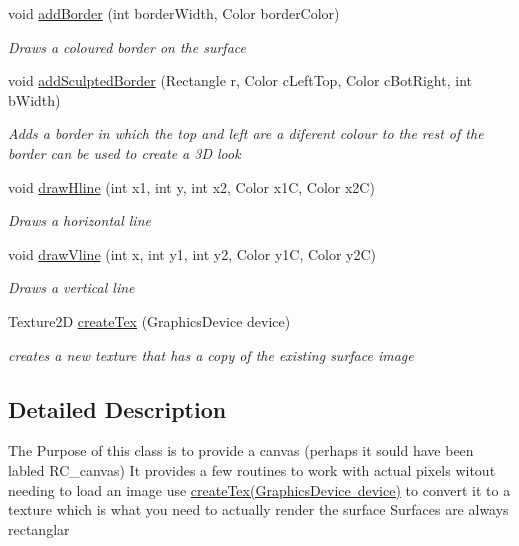 \begin{DoxyCompactItemize}
void \mbox{\hyperlink{class_r_c___framework_1_1_r_c___surface_afe965ef242eba8173932ac8bc19ec6e9}{add\+Border}} (int border\+Width, Color border\+Color)
\begin{DoxyCompactList}\small\item\em Draws a coloured border on the surface \end{DoxyCompactList}\item 
void \mbox{\hyperlink{class_r_c___framework_1_1_r_c___surface_ad16458caf26de6edba572ce3ac85342c}{add\+Sculpted\+Border}} (Rectangle r, Color c\+Left\+Top, Color c\+Bot\+Right, int b\+Width)
\begin{DoxyCompactList}\small\item\em Adds a border in which the top and left are a diferent colour to the rest of the border can be used to create a 3D look \end{DoxyCompactList}\item 
void \mbox{\hyperlink{class_r_c___framework_1_1_r_c___surface_ad339e6a77515c0d9a59f55f886246a9d}{draw\+Hline}} (int x1, int y, int x2, Color x1C, Color x2C)
\begin{DoxyCompactList}\small\item\em Draws a horizontal line \end{DoxyCompactList}\item 
void \mbox{\hyperlink{class_r_c___framework_1_1_r_c___surface_adfa7830cd882206d779179da1a9622ac}{draw\+Vline}} (int x, int y1, int y2, Color y1C, Color y2C)
\begin{DoxyCompactList}\small\item\em Draws a vertical line \end{DoxyCompactList}\item 
Texture2D \mbox{\hyperlink{class_r_c___framework_1_1_r_c___surface_a88a1b5fd5ab87f2f3cdb9bf0bc825ffc}{create\+Tex}} (Graphics\+Device device)
\begin{DoxyCompactList}\small\item\em creates a new texture that has a copy of the existing surface image \end{DoxyCompactList}\end{DoxyCompactItemize}


\subsection{Detailed Description}
The Purpose of this class is to provide a canvas (perhaps it sould have been labled R\+C\+\_\+canvas) It provides a few routines to work with actual pixels witout needing to load an image use \mbox{\hyperlink{class_r_c___framework_1_1_r_c___surface_a88a1b5fd5ab87f2f3cdb9bf0bc825ffc}{create\+Tex(\+Graphics\+Device device)}} to convert it to a texture which is what you need to actually render the surface Surfaces are always rectanglar 



